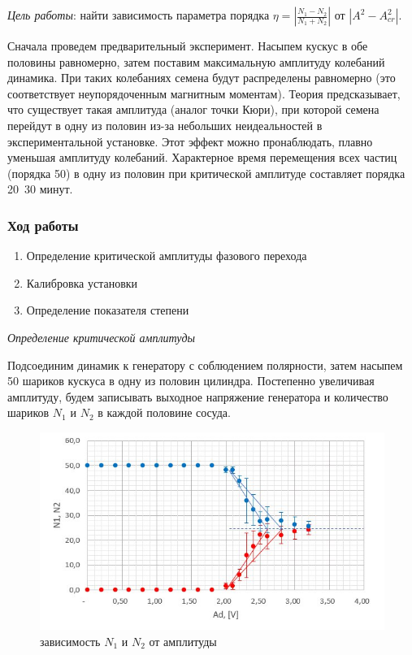 \documentclass[a4paper, 12pt]{article}
\begin{document}
\emph{Цель работы}: найти зависимость параметра порядка $\eta = \left\lvert \frac{N_1 - N_2}{N_1 + N_2} \right\rvert$ от $\left\vert A^2 - A_{cr}^2 \right\vert$.


Сначала проведем предварительный эксперимент. Насыпем кускус в обе половины равномерно, затем поставим максимальную амплитуду колебаний динамика. При таких колебаниях семена будут распределены равномерно (это соответствует неупорядоченным магнитным моментам). Теория предсказывает, что существует такая амплитуда (аналог точки Кюри), при которой семена перейдут в одну из половин из-за небольших неидеальностей в экспериментальной установке. Этот эффект можно пронаблюдать, плавно уменьшая амплитуду колебаний. Характерное время перемещения всех частиц (порядка 50) в одну из половин при критической амплитуде составляет порядка 20~30 минут.


\subsubsection*{Ход работы}

\begin{enumerate}
	\item Определение критической амплитуды фазового перехода
	\item Калибровка установки
	\item Определение показателя степени
\end{enumerate}

\emph{Определение критической амплитуды}

Подсоединим динамик к генератору с соблюдением полярности, затем насыпем 50 шариков кускуса в одну из половин цилиндра. Постепенно увеличивая амплитуду, будем записывать выходное напряжение генератора и количество шариков $N_1$ и $N_2$ в каждой половине сосуда.

\begin{figure}
	\includegraphics[scale=0.8]{img/N(V).jpg}
	\caption{зависимость $N_1$ и $N_2$ от амплитуды}
\end{figure}
\end{document}
